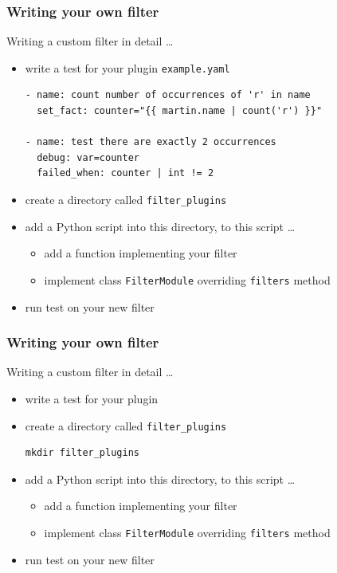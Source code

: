 \documentclass[pdf]{beamer}
\begin{document}
\begin{frame}[t,fragile]
  \frametitle{Writing your own filter}
  Writing a custom filter in detail \ldots
  \begin{itemize}
    \item \alert {write a test for your plugin \texttt{example.yaml}}
      \begin{lstlisting}
- name: count number of occurrences of 'r' in name
  set_fact: counter="{{ martin.name | count('r') }}"

- name: test there are exactly 2 occurrences
  debug: var=counter
  failed_when: counter | int != 2
      \end{lstlisting}
    \item {create a directory called \texttt{filter\_plugins}}
    \item {add a Python script into this directory, to this script \ldots}
      \begin{itemize}
        \item {add a function implementing your filter}
        \item {implement class \texttt{FilterModule} overriding \texttt{filters} method}
      \end{itemize}
    \item {run test on your new filter}
  \end{itemize}
\end{frame}

\begin{frame}[t,fragile]
  \frametitle{Writing your own filter}
  Writing a custom filter in detail \ldots
  \begin{itemize}
    \item {write a test for your plugin}
    \item \alert {create a directory called \texttt{filter\_plugins}}
      \begin{lstlisting}
mkdir filter_plugins
      \end{lstlisting}
    \item {add a Python script into this directory, to this script \ldots}
      \begin{itemize}
        \item {add a function implementing your filter}
        \item {implement class \texttt{FilterModule} overriding \texttt{filters} method}
      \end{itemize}
    \item {run test on your new filter}
  \end{itemize}
\end{frame}
\end{document}
